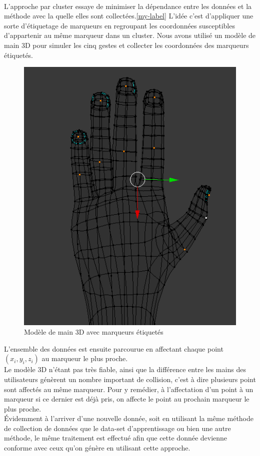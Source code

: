 \paragraph{}
L’approche par cluster essaye de minimiser la dépendance entre les données et la méthode avec la quelle elles sont collectées.\ref{my-label} L’idée c’est d’appliquer une sorte d’étiquetage de marqueurs en regroupant les coordonnées susceptibles d’appartenir au même marqueur dans un cluster. Nous avons utilisé un modèle de main 3D pour simuler les cinq gestes et collecter les coordonnées des marqueurs étiquetés.\\
\begin{center}
	\begin{figure}[H]
		\centering
		\includegraphics[scale=0.4]{images/3DModel.png}
		\caption{\small Modèle de main 3D avec marqueurs étiquetés}
	\end{figure}
\end{center}
L’ensemble des données est ensuite parcourue en affectant chaque point $(x_i,y_i,z_i)$ au marqueur le plus proche.\\
Le modèle 3D n’étant pas très fiable, ainsi que la différence entre les mains des utilisateurs génèrent un nombre important de collision, c’est à dire plusieurs point sont affectés au même marqueur. Pour y remédier, à l’affectation d’un point à un marqueur si ce dernier est déjà pris, on affecte le point au prochain marqueur le plus proche.\\
Évidemment à l’arriver d’une nouvelle donnée, soit en utilisant la même méthode de collection de données que le data-set d’apprentissage ou bien une autre méthode, le même traitement est effectué afin que cette donnée devienne conforme avec ceux qu’on génère en utilisant cette approche.